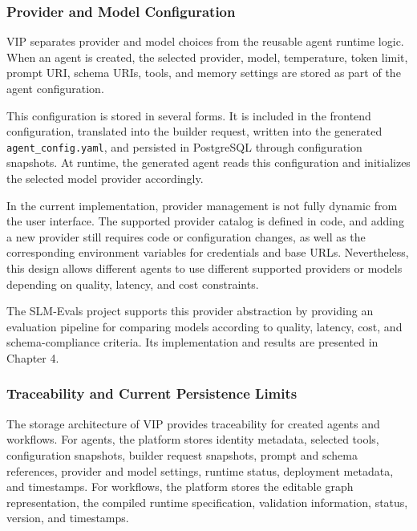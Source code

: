 \subsubsection{Provider and Model Configuration}

VIP separates provider and model choices from the reusable agent runtime logic. When an agent is created, the selected provider, model, temperature, token limit, prompt URI, schema URIs, tools, and memory settings are stored as part of the agent configuration.

This configuration is stored in several forms. It is included in the frontend configuration, translated into the builder request, written into the generated \texttt{agent\_config.yaml}, and persisted in PostgreSQL through configuration snapshots. At runtime, the generated agent reads this configuration and initializes the selected model provider accordingly.

In the current implementation, provider management is not fully dynamic from the user interface. The supported provider catalog is defined in code, and adding a new provider still requires code or configuration changes, as well as the corresponding environment variables for credentials and base URLs. Nevertheless, this design allows different agents to use different supported providers or models depending on quality, latency, and cost constraints.


\vspace{0.4cm}

The SLM-Evals project supports this provider abstraction by providing an evaluation pipeline for comparing models according to quality, latency, cost, and schema-compliance criteria. Its implementation and results are presented in Chapter 4.

\subsubsection{Traceability and Current Persistence Limits}

The storage architecture of VIP provides traceability for created agents and workflows. For agents, the platform stores identity metadata, selected tools, configuration snapshots, builder request snapshots, prompt and schema references, provider and model settings, runtime status, deployment metadata, and timestamps. For workflows, the platform stores the editable graph representation, the compiled runtime specification, validation information, status, version, and timestamps.

